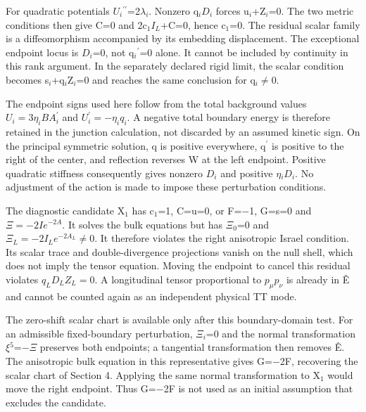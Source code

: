 \documentclass[11pt,a4paper]{article}
\begin{document}
For quadratic potentials \ensuremath{U_i}\ensuremath{{}^{\prime\prime}}=2\ensuremath{\lambda}\ensuremath{{}_{i}}. Nonzero q\ensuremath{{}_{i}}\ensuremath{D_i} forces u\ensuremath{{}_{i}}+Z\ensuremath{{}_{i}}=0. The two metric conditions then give C=0 and 2c\ensuremath{{}_{1}}\ensuremath{I_L}+C=0, hence c\ensuremath{{}_{1}}=0. The residual scalar family is a diffeomorphism accompanied by its embedding displacement. The exceptional endpoint locus is \ensuremath{D_i}=0, not q\ensuremath{{}_{i}}\ensuremath{{}^{\prime}}=0 alone. It cannot be included by continuity in this rank argument. In the separately declared rigid limit, the scalar condition becomes s\ensuremath{{}_{i}}+q\ensuremath{{}_{i}}Z\ensuremath{{}_{i}}=0 and reaches the same conclusion for q\ensuremath{{}_{i}}\ensuremath{\ne}0.

The endpoint signs used here follow from the total background values \ensuremath{U_i=3\eta_iBA_i^{\prime}} and \ensuremath{U_i^{\prime}=-\eta_iq_i}. A negative total boundary energy is therefore retained in the junction calculation, not discarded by an assumed kinetic sign. On the principal symmetric solution, q is positive everywhere, q\ensuremath{{}^{\prime}} is positive to the right of the center, and reflection reverses W at the left endpoint. Positive quadratic stiffness consequently gives nonzero \ensuremath{D_i} and positive \ensuremath{\eta}\ensuremath{{}_{i}}\ensuremath{D_i}. No adjustment of the action is made to impose these perturbation conditions.

The diagnostic candidate X\ensuremath{{}_{1}} has c\ensuremath{{}_{1}}=1, C=u=0, or F=\ensuremath{-}1, G=s=0 and \ensuremath{\Xi=-2Ie^{-2A}}. It solves the bulk equations but has \ensuremath{\Xi_0}=0 and \ensuremath{\Xi_L=-2I_Le^{-2A_L}\ne0}. It therefore violates the right anisotropic Israel condition. Its scalar trace and double-divergence projections vanish on the null shell, which does not imply the tensor equation. Moving the endpoint to cancel this residual violates \ensuremath{q_LD_LZ_L=0}. A longitudinal tensor proportional to \ensuremath{p_\mu p_\nu} is already in Ê and cannot be counted again as an independent physical TT mode.

The zero-shift scalar chart is available only after this boundary-domain test. For an admissible fixed-boundary perturbation, \ensuremath{\Xi}\ensuremath{{}_{i}}=0 and the normal transformation \ensuremath{\xi}\ensuremath{{}^{5}}=\ensuremath{-}\ensuremath{\Xi} preserves both endpoints; a tangential transformation then removes Ê. The anisotropic bulk equation in this representative gives G=\ensuremath{-}2F, recovering the scalar chart of Section 4. Applying the same normal transformation to X\ensuremath{{}_{1}} would move the right endpoint. Thus G=\ensuremath{-}2F is not used as an initial assumption that excludes the candidate.
\end{document}
